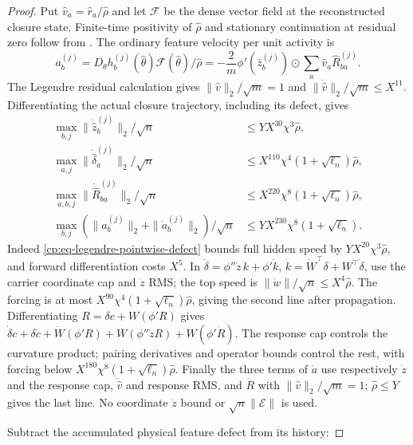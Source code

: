\begin{proof}
Put $\widehat v_a=\widehat r_a/\widehat\rho$ and let $\mathcal F$
be the dense vector field at the reconstructed closure state.
Finite-time positivity of $\widehat\rho$ and stationary continuation
at residual zero follow from . The ordinary
feature velocity per unit activity is
\[
a_b^{(j)}
=D_\theta h_b^{(j)}(\widehat\theta)\mathcal F(\widehat\theta)/\widehat\rho
=-\frac2m\phi'(\widehat z_b^{(j)})\odot
                 \sum_a\widehat v_a\widehat R_{ba}^{(j)}.
\]
The Legendre residual calculation gives
$\|\widehat v\|_2/\sqrt m=1$ and
$\|\dot{\widehat v}\|_2/\sqrt m\le X^{11}$.
Differentiating the actual closure trajectory, including its defect, gives
\begin{equation}
\begin{aligned}
\max_{b,j}\|\dot{\widehat z}_b^{(j)}\|_2/\sqrt n
 &\le YX^{30}\chi^3\widehat\rho,\\
\max_{a,j}\|\dot{\widehat\delta}_a^{(j)}\|_2/\sqrt n
 &\le X^{110}\chi^4(1+\sqrt{\ell_n})\widehat\rho,\\
\max_{a,b,j}\|\dot{\widehat R}_{ba}^{(j)}\|_2/\sqrt n
 &\le X^{220}\chi^8(1+\sqrt{\ell_n})\widehat\rho,\\
\max_{b,j}(\|a_b^{(j)}\|_2+\|\dot a_b^{(j)}\|_2)/\sqrt n
 &\le YX^{230}\chi^8(1+\sqrt{\ell_n}).
\end{aligned}
\label{cp:poly:eq:legendre-derivatives}
\end{equation}
Indeed \eqref{cp:eq-legendre-pointwise-defect} bounds full hidden speed
by $YX^{20}\chi^3\widehat\rho$, and forward differentiation costs
$X^5$. In
$\dot\delta=\phi''\dot z\,k+\phi'\dot k$,
$\dot k=\dot W^\top\delta+W^\top\dot\delta$, use the carrier
coordinate cap and $\dot z$ RMS; the top speed is
$\|\dot w\|/\sqrt n\le X^4\widehat\rho$.
The forcing is at most $X^{90}\chi^4(1+\sqrt{\ell_n})\widehat\rho$,
giving the second line after propagation.
Differentiating $R=\delta c+W(\phi'R)$ gives
$\dot\delta c+\delta\dot c+\dot W(\phi'R)
 +W(\phi''\dot zR)+W(\phi'\dot R)$.
The response cap controls the curvature product; pairing derivatives
and operator bounds control the rest, with forcing below
$X^{180}\chi^8(1+\sqrt{\ell_n})\widehat\rho$.
Finally the three terms of $\dot a$ use respectively
$\dot z$ and the response cap, $\dot{\widehat v}$ and response RMS,
and $\dot R$ with $\|\widehat v\|_2/\sqrt m=1$; $\widehat\rho\le Y$
gives the last line. No coordinate $\dot z$ bound or
$\sqrt n\|\mathcal E\|$ is used.

Subtract the accumulated physical feature defect from its history:


\end{proof}
